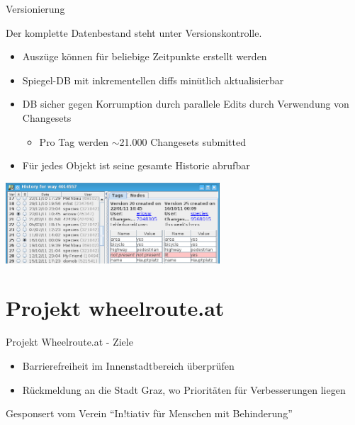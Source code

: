 \documentclass{beamer}
\begin{document}
\begin{frame}{Versionierung}

Der komplette Datenbestand steht unter Versionskontrolle.
\begin{itemize}
  \item Auszüge können für beliebige Zeitpunkte erstellt werden
  \item Spiegel-DB mit inkrementellen diffs minütlich aktualisierbar
  \item DB sicher gegen Korrumption durch parallele Edits durch Verwendung von Changesets
  \begin{itemize}
    \item Pro Tag werden $\sim$21.000 Changesets submitted
  \end{itemize}
  \item Für jedes Objekt ist seine gesamte Historie abrufbar
\end{itemize}

 \hfill \includegraphics[width=8cm]{history.png}


\end{frame}


\section{Projekt wheelroute.at}

\begin{frame}{Projekt Wheelroute.at - Ziele}


    \begin{itemize}
       \item Barrierefreiheit im Innenstadtbereich überprüfen

         \pause

      \vspace{1cm}

      \item Rückmeldung an die Stadt Graz, wo Prioritäten für Verbesserungen liegen
    \end{itemize}

Gesponsert vom Verein ``In!tiativ für Menschen mit Behinderung''

\end{frame}
\end{document}
